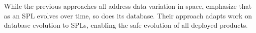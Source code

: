 While the previous approaches all address data variation in space,
\citet{dbSPLevolve} emphasize that as an SPL evolves over time, so does its
database. Their approach adapts work on database evolution to SPLs, enabling
the safe evolution of all deployed products.
%



